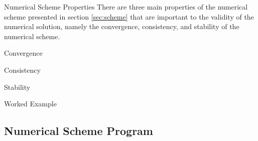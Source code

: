 \documentclass{article}
\begin{document}
\begin{section}{Numerical Scheme Properties}\label{sec:scheme_prop}
  There are three main properties of the numerical scheme presented in section
  \ref{sec:scheme} that are important to the validity of the numerical solution,
  namely the convergence, consistency, and stability of the numerical scheme.
  \begin{subsection}{Convergence}
  \end{subsection}

  \begin{subsection}{Consistency}
  \end{subsection}

  \begin{subsection}{Stability}
  \end{subsection}

\end{section}


\begin{section}{Worked Example}
\end{section}


\newpage
\begin{appendices}
  \section{Numerical Scheme Program}
\end{appendices}
\end{document}
